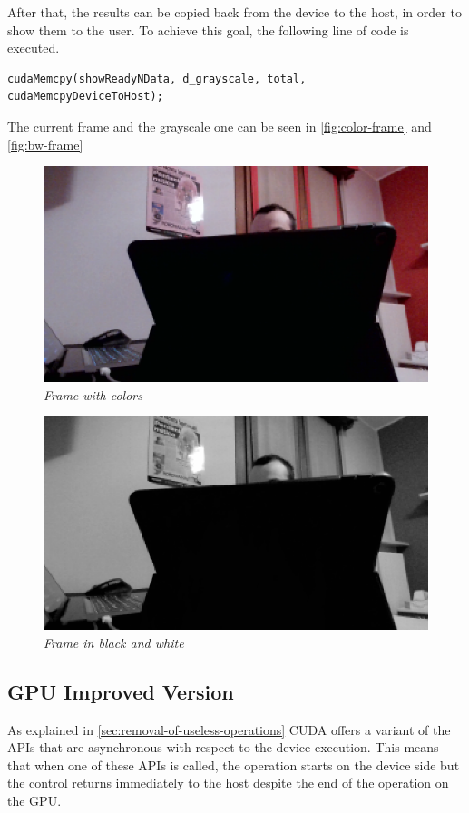 \documentclass[paper=a4, fontsize=10pt]{scrartcl}	%
\begin{document}
	After that, the results can be copied back from the device to the host, in order to show them to the user. To achieve this goal, the following line of code is executed.
	
	\begin{lstlisting}[style=CStyle]	
	cudaMemcpy(showReadyNData, d_grayscale, total, cudaMemcpyDeviceToHost);
	\end{lstlisting}

	The current frame and the grayscale one can be seen in \autoref{fig:color-frame} and \autoref{fig:bw-frame}
	

	\begin{figure}[H]
		\centering
		\includegraphics[width=0.70\linewidth]{images/bw/color_frame.png}
		\caption{\textit{Frame with colors}}
		\label{fig:color-frame}
	\end{figure}

	\begin{figure}[H]
		\centering
		\includegraphics[width=0.70\linewidth]{images/bw/bw_frame.png}
		\caption{\textit{Frame in black and white}}
		\label{fig:bw-frame}
	\end{figure}

	\subsection{GPU Improved Version}

	As explained in \autoref{sec:removal-of-useless-operations} CUDA offers a variant of the APIs that are asynchronous with respect to the device execution. This means that when one of these APIs is called, the operation starts on the device side but the control returns immediately to the host despite the end of the operation on the GPU. 
\end{document}
